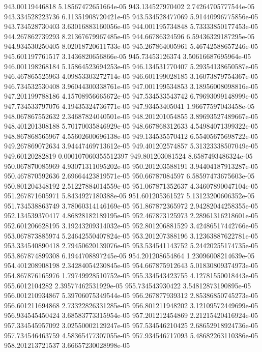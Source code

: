 {943.00119446818 5.18567472651664e-05
943.134527970402 2.74264705777544e-05
943.334528223736 6.11351908720421e-05
943.534528477069 5.91440996775856e-05
943.734528730403 3.63016883160056e-05
944.001195734848 5.73333850177453e-05
944.267862739293 8.21367679967485e-05
944.66786324596 6.59436329187295e-05
944.934530250405 8.02018720611733e-05
945.267864005961 5.46742588657246e-05
945.601197761517 3.1436820656866e-05
945.73453126374 3.50616687695964e-05
946.001198268184 5.15864523694253e-05
946.134531770407 5.29354138650587e-05
946.467865525963 4.09853303272714e-05
946.601199028185 3.16073879754367e-05
946.734532530408 3.96044300338761e-05
947.001199534853 3.18956008098816e-05
947.201199788186 4.15708956665672e-05
947.534533543742 6.79693099148999e-05
947.734533797076 4.19435324736771e-05
947.93453405041 1.96677597043458e-05
948.067867552632 2.34687824040501e-05
948.201201054855 3.89693527489667e-05
948.401201308188 5.70170035846929e-05
948.667868312633 4.54984071399322e-05
948.867868565967 4.55602600696138e-05
949.134535570412 6.55405675698722e-05
949.267869072634 3.94447469713612e-05
949.401202574857 5.31323338507049e-05
949.60120282819 0.000107060355512397
949.801203081524 8.6587493486324e-05
950.067870085969 4.93071311095202e-05
950.201203588191 3.94404187913287e-05
950.467870592636 2.69664423819571e-05
950.66787084597 6.58597473675603e-05
950.801204348192 2.51227884014559e-05
951.067871352637 4.34607890047104e-05
951.267871605971 5.8434927180388e-05
951.601205361527 5.13123200606352e-05
951.734538863749 3.78060314146169e-05
951.867872365972 2.94282044258355e-05
952.134539370417 4.86828182189195e-05
952.467873125973 2.28961316218601e-05
952.601206628195 3.19243209314032e-05
952.801206881529 3.42486517442766e-05
953.067873885974 5.24642550407824e-05
953.201207388196 3.12363887622781e-05
953.334540890418 2.79450620139076e-05
953.534541143752 5.24420255174735e-05
953.867874899308 6.1944708897245e-05
954.201208654864 1.23096008214639e-05
954.401208908198 2.34284054230845e-05
954.667875912643 5.01830809374973e-05
954.867876165976 1.79749928510752e-05
955.334543423755 4.12781550018443e-05
955.6012104282 2.39577462531929e-05
955.734543930422 3.54812873190895e-05
956.001210934867 5.39706075349544e-05
956.267877939312 2.85386850745273e-05
956.601211694868 2.73322826331285e-05
956.801211948202 3.12109572449699e-05
956.934545450424 3.68583773315954e-05
957.201212454869 2.21215420416924e-05
957.334545957092 3.02550002129247e-05
957.534546210425 2.68652918924736e-05
957.734546463759 4.58365477307055e-05
957.934546717093 5.48682263110386e-05
958.201213721537 3.66657230028998e-05
}
